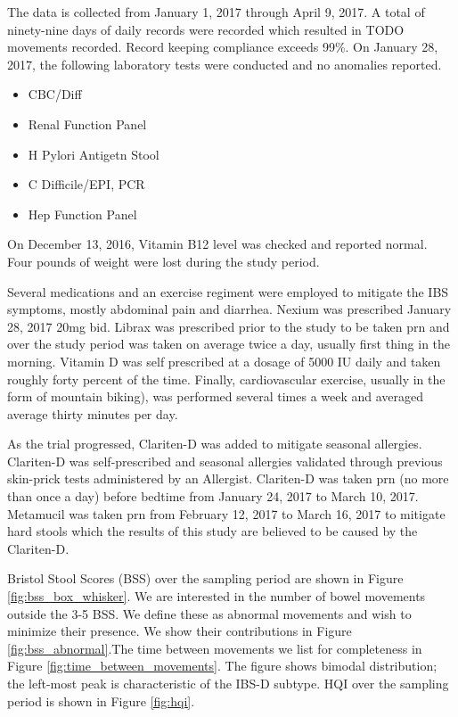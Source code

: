 \documentclass[conference]{IEEEtran}
\begin{document}
The data is collected from January 1, 2017 through April 9, 2017. A total of ninety-nine days of daily records were recorded which resulted in TODO movements recorded.  Record keeping compliance exceeds 99\%. On January 28, 2017, the following laboratory tests were conducted and no anomalies reported.
\begin{itemize}
\item CBC/Diff
\item Renal Function Panel
\item H Pylori Antigetn Stool
\item C Difficile/EPI, PCR
\item Hep Function Panel
\end{itemize}
On December 13, 2016, Vitamin B12 level was checked and reported normal. Four pounds of weight were lost during the study period.

Several medications and an exercise regiment were employed to mitigate the IBS symptoms, mostly abdominal pain and diarrhea. Nexium was prescribed January 28, 2017 20mg bid.  Librax was prescribed prior to the study to be taken prn and over the study period was taken on average twice a day, usually first thing in the morning. Vitamin D was self prescribed at a dosage of 5000 IU daily and taken roughly forty percent of the time. Finally, cardiovascular exercise, usually in the form of mountain biking), was performed several times a week and averaged average thirty minutes per day.

As the trial progressed, Clariten-D was added to mitigate seasonal allergies. Clariten-D was self-prescribed and seasonal allergies validated through previous skin-prick tests administered by an Allergist. Clariten-D was taken prn (no more than once a day) before bedtime from January 24, 2017 to March 10, 2017. Metamucil was taken prn from February 12, 2017 to March 16, 2017 to mitigate hard stools which the results of this study are believed to be caused by the Clariten-D.

Bristol Stool Scores (BSS) over the sampling period are shown in Figure \ref{fig:bss_box_whisker}. We are interested in the number of bowel movements outside the 3-5 BSS. We define these as abnormal movements and wish to minimize their presence.  We show their contributions in Figure \ref{fig:bss_abnormal}.The time between movements we list for completeness in Figure \ref{fig:time_between_movements}.  The figure shows bimodal distribution; the left-most peak is characteristic of the IBS-D subtype. HQI over the sampling period is shown in Figure \ref{fig:hqi}.
\end{document}
